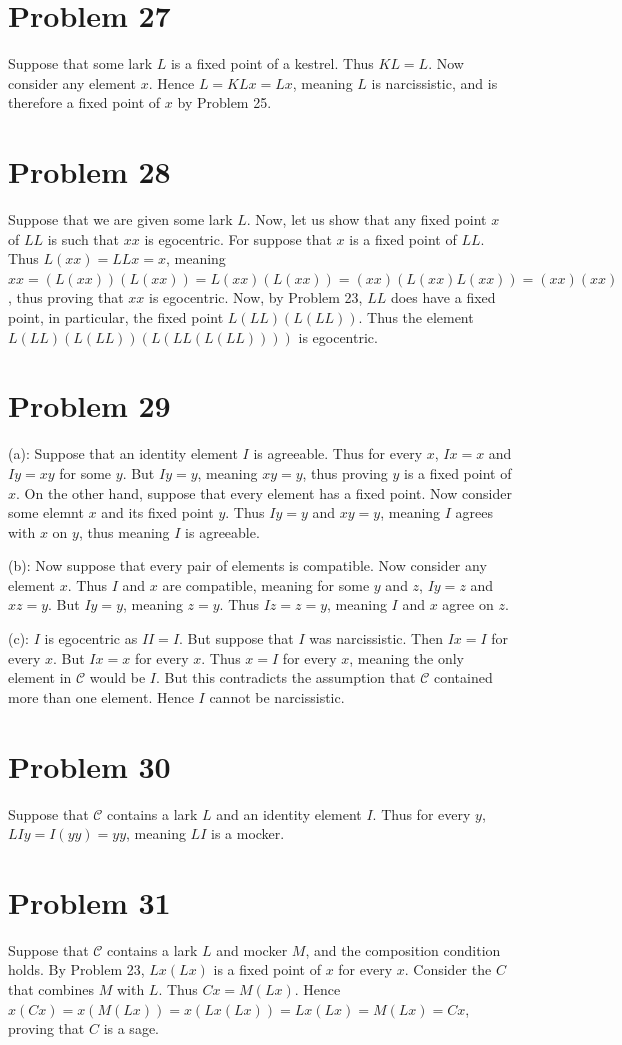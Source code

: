 \documentclass{article}
\theoremstyle{definition}
\begin{document}
\section*{Problem 27}
Suppose that some lark $L$ is a fixed point of a kestrel. Thus $KL=L$. Now consider any element $x$. Hence $L=KLx=Lx$, meaning $L$ is narcissistic, and is therefore 
a fixed point of $x$ by Problem 25.

\section*{Problem 28}
Suppose that we are given some lark $L$. Now, let us show that any fixed point $x$ of $LL$ is such that $xx$ is egocentric. For suppose that $x$ is a fixed point of 
$LL$. Thus $L(xx)=LLx=x$, meaning $xx=(L(xx))(L(xx))=L(xx)(L(xx))=(xx)(L(xx)L(xx))=(xx)(xx)$, thus proving that $xx$ is egocentric. Now, by Problem 23, $LL$ does have a 
fixed point, in particular, the fixed point $L(LL)(L(LL))$. Thus the element $L(LL)(L(LL))(L(LL(L(LL))))$ is egocentric.

\section*{Problem 29}
(a): Suppose that an identity element $I$ is agreeable. Thus for every $x$, $Ix=x$ and $Iy=xy$ for some $y$. But $Iy=y$, meaning $xy=y$, thus proving $y$ is a fixed point of 
$x$. On the other hand, suppose that every element has a fixed point. Now consider some elemnt $x$ and its fixed point $y$. Thus $Iy=y$ and $xy=y$, meaning 
$I$ agrees with $x$ on $y$, thus meaning $I$ is agreeable.


(b): Now suppose that every pair of elements is compatible. Now consider any element $x$. Thus $I$ and $x$ are compatible, meaning for some $y$ and $z$, 
$Iy=z$ and $xz=y$. But $Iy=y$, meaning $z=y$. Thus $Iz=z=y$, meaning $I$ and $x$ agree on $z$.


(c): $I$ is egocentric as $II=I$. But suppose that $I$ was narcissistic. Then $Ix=I$ for every $x$. But $Ix=x$ for every $x$. Thus $x=I$ for every $x$, meaning 
the only element in $\mathcal{C}$ would be $I$. But this contradicts the assumption that $\mathcal{C}$ contained more than one element. Hence $I$ cannot be narcissistic. 

\section*{Problem 30}
Suppose that $\mathcal{C}$ contains a lark $L$ and an identity element $I$. Thus for every $y$, $LIy=I(yy)=yy$, meaning $LI$ is a mocker.

\section*{Problem 31}
Suppose that $\mathcal{C}$ contains a lark $L$ and mocker $M$, and the composition condition holds. By Problem 23, $Lx(Lx)$ is a fixed point of $x$ for every $x$. Consider 
the $C$ that combines $M$ with $L$. Thus $Cx=M(Lx)$. Hence $x(Cx)=x(M(Lx))=x(Lx(Lx))=Lx(Lx)=M(Lx)=Cx$, proving that $C$ is a sage.
\end{document}
